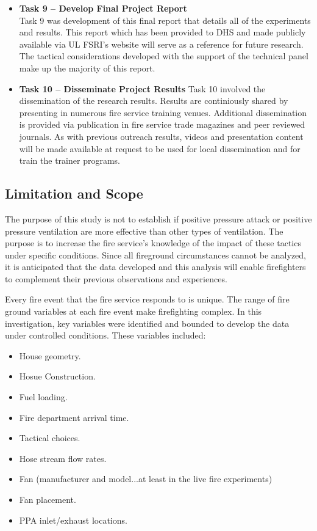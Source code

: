 \documentclass{article}
\begin{document}
\begin{itemize}
	\item \textbf{Task 9 – Develop Final Project Report} \\
	Task 9 was development of this final report that details all of the experiments and results. This report which has been provided to DHS and made publicly available via UL FSRI's website will serve as a reference for future research. The tactical considerations developed with the support of the technical  panel make up the majority of this report.
	
	\item \textbf{Task 10 – Disseminate Project Results}
	Task 10 involved the dissemination of the research results. Results are continiously shared by presenting in numerous fire service training venues. Additional dissemination is provided via publication in fire service trade magazines and peer reviewed journals. As with previous outreach results, videos and presentation content will be made available at request to be used for local dissemination and for train the trainer programs. 

\end{itemize}

\subsection{Limitation and Scope}

The purpose of this study is not to establish if positive pressure attack or positive pressure ventilation are more effective than other types of ventilation. The purpose is to increase the fire service’s knowledge of the impact of these tactics under specific conditions. Since all fireground circumstances cannot be analyzed, it is anticipated that the data developed and this analysis will enable firefighters to complement their previous observations and experiences.

Every fire event that the fire service responds to is unique. The range of fire ground variables at each fire event make firefighting complex. In this investigation, key variables were identified and bounded to develop the data under controlled conditions. These variables included:

\begin{itemize}
	\item House geometry.
	\item Hosue Construction.
	\item Fuel loading. 
	\item Fire department arrival time. 
	\item Tactical choices.
	\item Hose stream flow rates.
	\item Fan (manufacturer and model...at least in the live fire experiments)
	\item Fan placement.
	\item PPA inlet/exhaust locations. 
\end{itemize}
\end{document}
